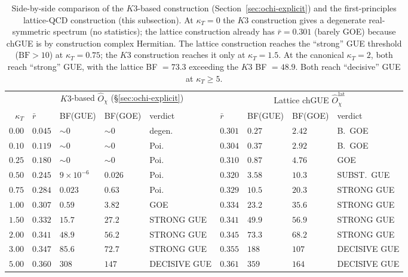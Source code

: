 \documentclass[11pt,a4paper]{article}
\newcommand{\Opchi}{\hat{O}_\chi}
\theoremstyle{plain}
\theoremstyle{definition}
\theoremstyle{remark}
\begin{document}
\begin{table}[h]
\centering
\footnotesize
\setlength{\tabcolsep}{3pt}
\begin{tabular}{r l l l l l l l l}
\toprule
& \multicolumn{4}{c}{$K3$-based $\Opchi$ (§\ref{sec:ochi-explicit})}
& \multicolumn{4}{c}{Lattice chGUE $\Opchi^{\mathrm{lat}}$} \\
\cmidrule(lr){2-5} \cmidrule(lr){6-9}
$\kappa_T$ & $\bar r$ & BF(GUE) & BF(GOE) & verdict
           & $\bar r$ & BF(GUE) & BF(GOE) & verdict \\
\midrule
$0.00$ & $0.045$ & $\sim 0$ & $\sim 0$ & degen.
       & $0.301$ & $0.27$ & $2.42$ & B.\ GOE \\
$0.10$ & $0.119$ & $\sim 0$ & $\sim 0$ & Poi.
       & $0.304$ & $0.37$ & $2.92$ & B.\ GOE \\
$0.25$ & $0.180$ & $\sim 0$ & $\sim 0$ & Poi.
       & $0.310$ & $0.87$ & $4.76$ & GOE \\
$0.50$ & $0.245$ & $9\!\times\!10^{-6}$ & $0.026$ & Poi.
       & $0.320$ & $3.58$ & $10.3$ & SUBST.\ GUE \\
$0.75$ & $0.284$ & $0.023$ & $0.63$ & Poi.
       & $0.329$ & $10.5$ & $20.3$ & STRONG GUE \\
$1.00$ & $0.307$ & $0.59$ & $3.82$ & GOE
       & $0.334$ & $23.2$ & $35.6$ & STRONG GUE \\
$1.50$ & $0.332$ & $15.7$ & $27.2$ & STRONG GUE
       & $0.341$ & $49.9$ & $56.9$ & STRONG GUE \\
$2.00$ & $0.341$ & $48.9$ & $56.2$ & STRONG GUE
       & $0.345$ & $73.3$ & $68.2$ & STRONG GUE \\
$3.00$ & $0.347$ & $85.6$ & $72.7$ & STRONG GUE
       & $0.355$ & $188$ & $107$ & DECISIVE GUE \\
$5.00$ & $0.360$ & $308$ & $147$ & DECISIVE GUE
       & $0.361$ & $359$ & $164$ & DECISIVE GUE \\
\bottomrule
\end{tabular}
\caption{Side-by-side comparison of the $K3$-based construction
(Section~\ref{sec:ochi-explicit}) and the first-principles
lattice-QCD construction (this subsection).  At $\kappa_T = 0$
the $K3$ construction gives a degenerate real-symmetric spectrum
(no statistics); the lattice construction already has
$\bar r = 0.301$ (barely GOE) because chGUE is by construction
complex Hermitian.  The lattice construction reaches the
``strong'' GUE threshold ($\mathrm{BF} > 10$) at $\kappa_T = 0.75$;
the $K3$ construction reaches it only at $\kappa_T = 1.5$.  At
the canonical $\kappa_T = 2$, both reach ``strong'' GUE, with
the lattice BF $= 73.3$ exceeding the $K3$ BF $= 48.9$.  Both
reach ``decisive'' GUE at $\kappa_T \ge 5$.}
\label{tab:ochi-lattice-vs-K3}
\end{table}
\end{document}
